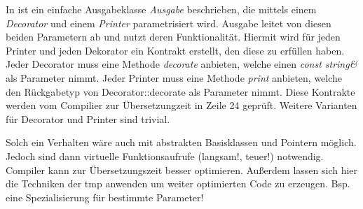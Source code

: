In  ist ein einfache Ausgabeklasse \emph{Ausgabe} beschrieben, die mittels einem \emph{Decorator} und einem \emph{Printer} parametrisiert wird. Ausgabe leitet von diesen beiden Parametern ab und nutzt deren Funktionalität. Hiermit wird für jeden Printer und jeden Dekorator ein Kontrakt erstellt, den diese zu erfüllen haben. Jeder Decorator muss eine Methode \emph{decorate} anbieten, welche einen \emph{const string\&} als Parameter nimmt. Jeder Printer muss eine Methode \emph{print} anbieten, welche den Rückgabetyp von Decorator::decorate als Parameter nimmt. Diese Kontrakte werden vom Compilier zur Übersetzungzeit in Zeile 24 geprüft. Weitere Varianten für Decorator und Printer sind trivial.

Solch ein Verhalten wäre auch mit abstrakten Basisklassen und Pointern möglich. Jedoch sind dann virtuelle Funktionsaufrufe (langsam!, teuer!) notwendig. Compiler kann zur Übersetzungszeit besser optimieren. Außerdem lassen sich hier die Techniken der \ac{tmp} anwenden um weiter optimierten Code zu erzeugen. Bsp. eine Spezialisierung für bestimmte Parameter!


